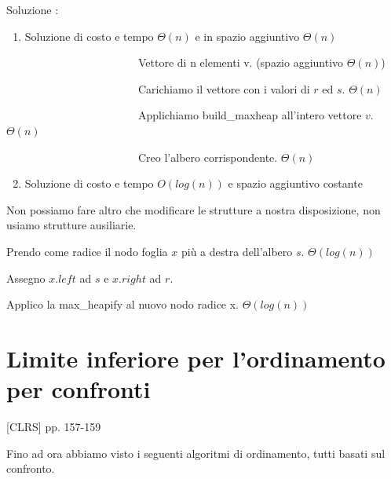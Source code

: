 \documentclass[tikz]{article}
\providecommand{\tightlist}{%
  \setlength{\itemsep}{0pt}\setlength{\parskip}{0pt}}
\begin{document}
{Soluzione :}

\begin{enumerate}
\tightlist
\item
  {Soluzione di costo e tempo $\Theta(n)$ e in spazio aggiuntivo $\Theta(n)$}
\end{enumerate}

{~~~~~~~~~~~~~~~~~~~~~~~~Vettore di n elementi v. (spazio aggiuntivo $\Theta(n)$)}

{~~~~~~~~~~~~~~~~~~~~~~~~Carichiamo il vettore con i valori di $r$ ed $s$. $\Theta(n)$}

{~~~~~~~~~~~~~~~~~~~~~~~~Applichiamo build\_maxheap all'intero vettore $v$. $\Theta(n)$}

{~~~~~~~~~~~~~~~~~~~~~~~~Creo l'albero corrispondente. $\Theta(n)$}

\begin{enumerate}
\setcounter{enumi}{1}
\tightlist
\item
  {Soluzione di costo e tempo $O(log(n))$ e spazio aggiuntivo costante}
\end{enumerate}

{Non possiamo fare altro che modificare le strutture a nostra disposizione, non usiamo strutture ausiliarie.}

{Prendo come radice il nodo foglia $x$ più a destra dell'albero $s$. $\Theta(log(n))$}

{Assegno $x.left$ ad $s$ e $x.right$ ad $r$.}

{Applico la max\_heapify al nuovo nodo radice x. $\Theta(log(n))$}


\section{Limite inferiore per l'ordinamento per confronti}

{{[}CLRS{]} pp. 157-159}

{Fino ad ora abbiamo visto i seguenti algoritmi di ordinamento, tutti basati sul confronto.}
\end{document}
